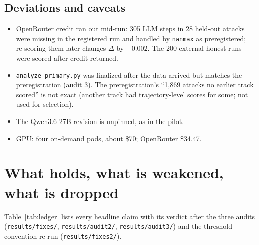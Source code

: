 \documentclass[11pt]{article}
\begin{document}
\subsection{Deviations and caveats}
\begin{itemize}
\item OpenRouter credit ran out mid-run: 305 LLM steps in 28 held-out attacks were missing in the registered run and handled by \texttt{nanmax} as preregistered; re-scoring them later changes $\Delta$ by $-0.002$. The 200 external honest runs were scored after credit returned.
\item \texttt{analyze\_primary.py} was finalized after the data arrived but matches the preregistration (audit 3). The preregistration's ``1{,}869 attacks no earlier track scored'' is not exact (another track had trajectory-level scores for some; not used for selection).
\item The Qwen3.6-27B revision is unpinned, as in the pilot.
\item GPU: four on-demand pods, about \$70; OpenRouter \$34.47.
\end{itemize}

\section{What holds, what is weakened, what is dropped}
Table~\ref{tab:ledger} lists every headline claim with its verdict after the three audits (\nolinkurl{results/fixes/}, \nolinkurl{results/audit2/}, \nolinkurl{results/audit3/}) and the threshold-convention re-run (\nolinkurl{results/fixes2/}).
\end{document}
